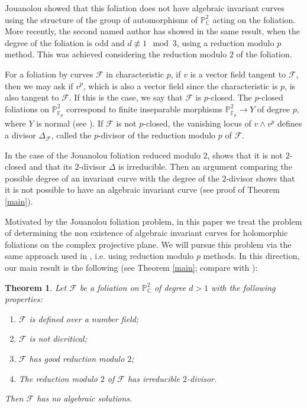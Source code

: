 \documentclass[reqno,oneside,11pt]{amsart}
\newtheorem{theorem}{Theorem}
\theoremstyle{definition}
\begin{document}
Jouanolou \cite{jouanolou} showed that this foliation does not have algebraic invariant curves using the structure of the group of automorphisms of $\mathbb{P}^2_\mathbb{C}$ acting on the foliation. More recently, the second named author has showed in \cite{mendson2023arithmetic} the same result, when the degree of the foliation is odd and $d \not \equiv 1 \mod 3$, using a reduction modulo $p$ method. This was achieved considering the reduction modulo $2$ of the foliation. 

For a foliation by curves $\mathcal{F}$ in characteristic $p$, if $v$ is a vector field tangent to $\mathcal{F}$, then we may ask if $v^p$, which is also a vector field since the characteristic is $p$, is also tangent to $\mathcal{F}$. If this is the case, we say that $\mathcal{F}$ is $p$-closed. The $p$-closed foliations on $\mathbb{P}^2_{\overline{\mathbb{F}}_p} $ correspond to finite inseparable morphisms $\mathbb{P}^2_{\overline{\mathbb{F}}_p} \rightarrow Y$ of degree $p$, where $Y$ is normal (see \cite{rudakov1976inseparable}). If $\mathcal{F}$ is not $p$-closed, the vanishing locus of $v\wedge v^p$ defines a divisor $\Delta_\mathcal{F}$, called the $p$-divisor of the reduction modulo $p$ of $\mathcal{F}$.

In the case of the Jouanolou foliation reduced modulo $2$, \cite{mendson2023arithmetic} shows that it is not $2$-closed and that its $2$-divisor $\Delta$ is irreducible. Then an argument comparing the possible degree of an invariant curve with the degree of the $2$-divisor shows that it is not possible to have an algebraic invariant curve (see proof of Theorem \ref{main}).

Motivated by the Jouanolou foliation problem, in this paper we treat the problem of determining the non existence of algebraic invariant curves for holomorphic foliations on the complex projective plane. We will pursue this problem via the same approach used in \cite{mendson2023arithmetic}, i.e. using reduction modulo $p$ methods. In this direction, our main result is the following (see Theorem \ref{main}; compare with \cite{bost2001algebraic}):

\begin{theorem} \label{thmA}
     Let $\mathcal{F}$ be a foliation on $\mathbb{P}_{\mathbb{C}}^{2}$ of degree $d > 1$ with the following properties:
\begin{enumerate}
    \item $\mathcal{F}$ is defined over a number field;
    \item $\mathcal{F}$ is not dicritical;
    \item $\mathcal{F}$ has good reduction modulo $2$;
    \item The reduction modulo $2$ of $\mathcal{F}$ has irreducible $2$-divisor.
\end{enumerate}
Then $\mathcal{F}$ has no algebraic solutions.
\end{theorem}
\end{document}

